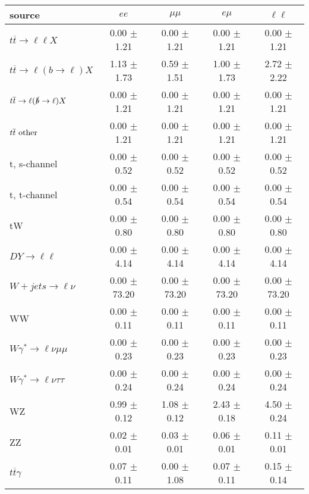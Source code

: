 \begin{tabular}{l|cccc} \hline\hline
source & $ee$ & $\mu\mu$ & $e\mu$ & $\ell\ell $ \\
\hline
$t\overline{t} \rightarrow \ell \ell X$ &  0.00 $\pm$  1.21 &  0.00 $\pm$  1.21 &  0.00 $\pm$  1.21 &  0.00 $\pm$  1.21 \\
$t\overline{t} \rightarrow \ell (b \rightarrow \ell) X$ &  1.13 $\pm$  1.73 &  0.59 $\pm$  1.51 &  1.00 $\pm$  1.73 &  2.72 $\pm$  2.22 \\
$t\overline{t} \rightarrow \ell (\slashed b \rightarrow \ell) X$ &  0.00 $\pm$  1.21 &  0.00 $\pm$  1.21 &  0.00 $\pm$  1.21 &  0.00 $\pm$  1.21 \\
        $t\overline{t}\ \rm{other}$ &  0.00 $\pm$  1.21 &  0.00 $\pm$  1.21 &  0.00 $\pm$  1.21 &  0.00 $\pm$  1.21 \\
\hline
                       t, s-channel &  0.00 $\pm$  0.52 &  0.00 $\pm$  0.52 &  0.00 $\pm$  0.52 &  0.00 $\pm$  0.52 \\
                       t, t-channel &  0.00 $\pm$  0.54 &  0.00 $\pm$  0.54 &  0.00 $\pm$  0.54 &  0.00 $\pm$  0.54 \\
                                 tW &  0.00 $\pm$  0.80 &  0.00 $\pm$  0.80 &  0.00 $\pm$  0.80 &  0.00 $\pm$  0.80 \\
\hline
         $DY \rightarrow \ell \ell$ &  0.00 $\pm$  4.14 &  0.00 $\pm$  4.14 &  0.00 $\pm$  4.14 &  0.00 $\pm$  4.14 \\
      $W+jets \rightarrow \ell \nu$ &  0.00 $\pm$ 73.20 &  0.00 $\pm$ 73.20 &  0.00 $\pm$ 73.20 &  0.00 $\pm$ 73.20 \\
                                 WW &  0.00 $\pm$  0.11 &  0.00 $\pm$  0.11 &  0.00 $\pm$  0.11 &  0.00 $\pm$  0.11 \\
\hline
$W\gamma^{*} \rightarrow \ell \nu \mu\mu$ &  0.00 $\pm$  0.23 &  0.00 $\pm$  0.23 &  0.00 $\pm$  0.23 &  0.00 $\pm$  0.23 \\
$W\gamma^{*} \rightarrow \ell \nu \tau\tau$ &  0.00 $\pm$  0.24 &  0.00 $\pm$  0.24 &  0.00 $\pm$  0.24 &  0.00 $\pm$  0.24 \\
                                 WZ &  0.99 $\pm$  0.12 &  1.08 $\pm$  0.12 &  2.43 $\pm$  0.18 &  4.50 $\pm$  0.24 \\
                                 ZZ &  0.02 $\pm$  0.01 &  0.03 $\pm$  0.01 &  0.06 $\pm$  0.01 &  0.11 $\pm$  0.01 \\
\hline
              $t\overline{t}\gamma$ &  0.07 $\pm$  0.11 &  0.00 $\pm$  1.08 &  0.07 $\pm$  0.11 &  0.15 $\pm$  0.14 \\

\end{tabular}
